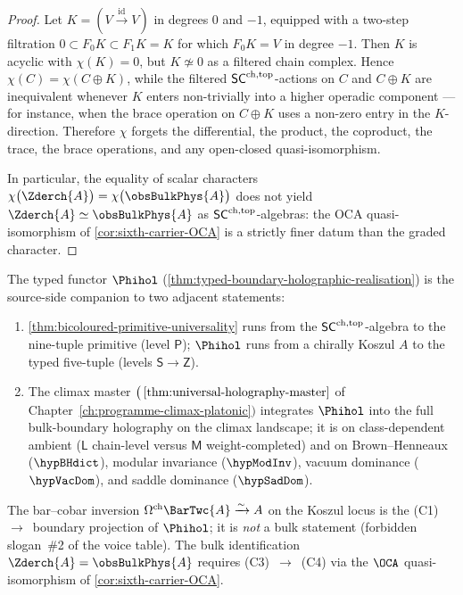 \begin{proof}
Let $K = (V \xrightarrow{\mathrm{id}} V)$ in degrees $0$ and $-1$,
equipped with a two-step filtration $0 \subset F_{0}K \subset F_{1}K
= K$ for which $F_{0}K = V$ in degree $-1$.  Then $K$ is acyclic with
$\chi(K) = 0$, but $K \not\simeq 0$ as a filtered chain complex.
Hence $\chi(C) = \chi(C \oplus K)$, while the filtered
$\mathsf{SC}^{\mathrm{ch},\mathrm{top}}$-actions on $C$ and $C \oplus K$ are inequivalent whenever
$K$ enters non-trivially into a higher operadic component --- for
instance, when the brace operation on $C \oplus K$ uses a non-zero
entry in the $K$-direction.  Therefore $\chi$ forgets the differential,
the product, the coproduct, the trace, the brace operations, and any
open-closed quasi-isomorphism.

In particular, the equality of scalar characters
$\chi\bigl(\Zderch{A}\bigr) = \chi\bigl(\obsBulkPhys{A}\bigr)$ does
not yield $\Zderch{A} \simeq \obsBulkPhys{A}$ as $\mathsf{SC}^{\mathrm{ch},\mathrm{top}}$-algebras:
the OCA quasi-isomorphism of \cref{cor:sixth-carrier-OCA} is a
strictly finer datum than the graded character.
\end{proof}

\begin{remark}
\label{rem:typed-hol-vs-climax-vs-bicoloured-universality}
The typed functor $\Phihol$
\textup{(}\cref{thm:typed-boundary-holographic-realisation}\textup{)}
is the source-side companion to two adjacent statements:
\begin{enumerate}[label=\textup{(\arabic*)}]
\item \cref{thm:bicoloured-primitive-universality} runs from the
$\mathsf{SC}^{\mathrm{ch},\mathrm{top}}$-algebra to the nine-tuple primitive (level $\mathsf{P}$);
$\Phihol$ runs from a chirally Koszul $A$ to the typed five-tuple
(levels $\mathsf{S} \to \mathsf{Z}$).
\item The climax master
$\bigl(\,\cref{thm:universal-holography-master}$ of
Chapter~\ref{ch:programme-climax-platonic}$\bigr)$
integrates $\Phihol$ into the full bulk-boundary holography on the
climax landscape; it is \ClaimStatusConditional on
class-dependent ambient ($\mathsf{L}$ chain-level versus $\mathsf{M}$
weight-completed) and on Brown--Henneaux ($\hypBHdict$), modular
invariance ($\hypModInv$), vacuum dominance ($\hypVacDom$), and
saddle dominance ($\hypSadDom$).
\end{enumerate}
The bar--cobar inversion
$\Omega^{\mathrm{ch}}\BarTwc{A} \xrightarrow{\sim} A$ on the Koszul
locus is the (C1)~$\to$~boundary projection of $\Phihol$; it is
\emph{not} a bulk statement (forbidden slogan~\#2 of the voice
table).  The bulk identification $\Zderch{A} = \obsBulkPhys{A}$
requires (C3)~$\to$~(C4) via the $\OCA$ quasi-isomorphism of
\cref{cor:sixth-carrier-OCA}.
\end{remark}

